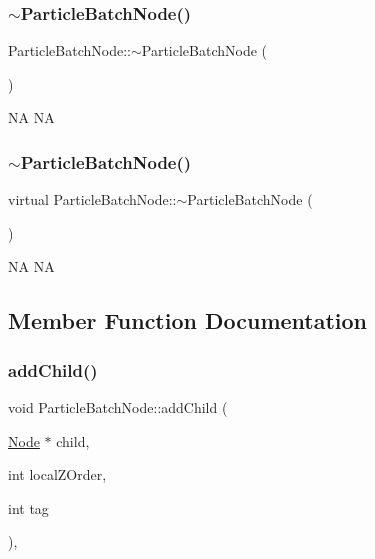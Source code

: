 \subsubsection{\texorpdfstring{$\sim$\+Particle\+Batch\+Node()}{~ParticleBatchNode()}\hspace{0.1cm}{\footnotesize\ttfamily [1/2]}}
{\footnotesize\ttfamily Particle\+Batch\+Node\+::$\sim$\+Particle\+Batch\+Node (\begin{DoxyParamCaption}{ }\end{DoxyParamCaption})\hspace{0.3cm}{\ttfamily [virtual]}}

NA  NA \mbox{\label{classParticleBatchNode_aeb7e2d17646bf9748cb1e274956edeb8}} 
\subsubsection{\texorpdfstring{$\sim$\+Particle\+Batch\+Node()}{~ParticleBatchNode()}\hspace{0.1cm}{\footnotesize\ttfamily [2/2]}}
{\footnotesize\ttfamily virtual Particle\+Batch\+Node\+::$\sim$\+Particle\+Batch\+Node (\begin{DoxyParamCaption}{ }\end{DoxyParamCaption})\hspace{0.3cm}{\ttfamily [virtual]}}

NA  NA 

\subsection{Member Function Documentation}
\mbox{\label{classParticleBatchNode_ae64b2ef0a26f90c90b7afd090ea12825}} 
\subsubsection{\texorpdfstring{add\+Child()}{addChild()}\hspace{0.1cm}{\footnotesize\ttfamily [1/4]}}
{\footnotesize\ttfamily void Particle\+Batch\+Node\+::add\+Child (\begin{DoxyParamCaption}\item[{\hyperlink{classNode}{Node} $\ast$}]{child,  }\item[{int}]{local\+Z\+Order,  }\item[{int}]{tag }\end{DoxyParamCaption})\hspace{0.3cm}{\ttfamily [override]}, {\ttfamily [virtual]}}

